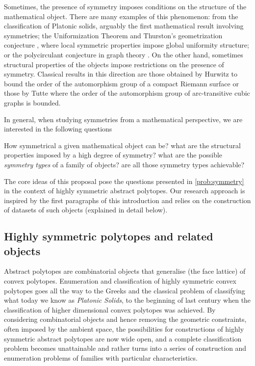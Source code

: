 \documentclass[a4paper,12pt,english]{article}
\begin{document}
Sometimes, the presence of symmetry imposes conditions on the structure of the mathematical object. 
There are many examples of this phenomenon: from the classification of Platonic solids, arguably the first mathematical result involving symmetries; the Uniformization Theorem \cite{Abikoff1981_UniformizationTheorem} and Thurston's geometrization conjecture \cite{Thurston1982_ThreeDimensionalManifolds}, where local symmetric properties impose global uniformity structure;  or the polycirculant conjecture in graph theory \cite{Marusic1981_VertexSymmetricDigraphs}. 
On the other hand, sometimes structural properties of the objects impose restrictions on the presence of symmetry. Classical results in this direction are those obtained by Hurwitz \cite{Hurwitz1892_UeberAlgebraischeGebilde} to bound the order of the automorphism group of a compact Riemann surface or those by Tutte \cite{Tutte1959_SymmetryCubicGraphs} where the order of the automorphism group of arc-transitive cubic graphs is bounded.

In general, when studying symmetries from a mathematical perspective, we are interested in the following questions

\begin{problem}\label{prob:symmetry}
  How symmetrical a given mathematical object can be? what are the structural properties imposed by a high degree of symmetry? what are the possible \emph{symmetry types} of a family of objects? are all those symmetry types achievable?
\end{problem}

The core ideas of this proposal pose the questions presented in \cref{prob:symmetry} in the context of highly symmetric abstract polytopes. Our research approach is inspired by the first paragraphs of this introduction and relies on the construction of datasets of such objects (explained in detail below).

\subsection*{Highly symmetric polytopes and related objects}

Abstract polytopes are combinatorial objects that generalise (the face lattice) of convex polytopes.
Enumeration and classification of highly symmetric convex polytopes goes all the way to the Greeks and the classical problem of classifying what today we know as \emph{Platonic Solids}, to the beginning of last century when the classification of higher dimensional convex polytopes was achieved.
By considering combinatorial objects and hence removing the geometric constraints, often imposed by the ambient space, the possibilities for constructions of highly symmetric abstract polytopes are now wide open, and a complete classification problem becomes unattainable and rather turns into a series of construction and enumeration problems of families with particular characteristics.
\end{document}
